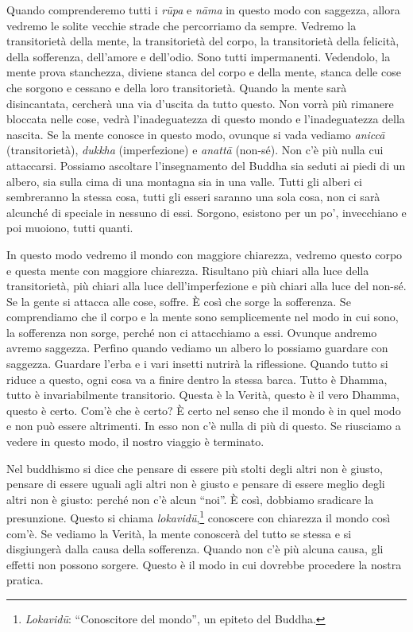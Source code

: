 Quando comprenderemo tutti i \emph{rūpa} e \emph{nāma} in questo modo
con saggezza, allora vedremo le solite vecchie strade che percorriamo da
sempre. Vedremo la transitorietà della mente, la transitorietà del
corpo, la transitorietà della felicità, della sofferenza, dell'amore e
dell'odio. Sono tutti impermanenti. Vedendolo, la mente prova
stanchezza, diviene stanca del corpo e della mente, stanca delle cose
che sorgono e cessano e della loro transitorietà. Quando la mente sarà
disincantata, cercherà una via d'uscita da tutto questo. Non vorrà più
rimanere bloccata nelle cose, vedrà l'inadeguatezza di questo mondo e
l'inadeguatezza della nascita. Se la mente conosce in questo modo,
ovunque si vada vediamo \emph{aniccā} (transitorietà), \emph{dukkha}
(imperfezione) e \emph{anattā} (non-sé). Non c'è più nulla cui
attaccarsi. Possiamo ascoltare l'insegnamento del Buddha sia seduti ai
piedi di un albero, sia sulla cima di una montagna sia in una valle.
Tutti gli alberi ci sembreranno la stessa cosa, tutti gli esseri saranno
una sola cosa, non ci sarà alcunché di speciale in nessuno di essi.
Sorgono, esistono per un po', invecchiano e poi muoiono, tutti quanti.

In questo modo vedremo il mondo con maggiore chiarezza, vedremo questo
corpo e questa mente con maggiore chiarezza. Risultano più chiari alla
luce della transitorietà, più chiari alla luce dell'imperfezione e più
chiari alla luce del non-sé. Se la gente si attacca alle cose, soffre. È
così che sorge la sofferenza. Se comprendiamo che il corpo e la mente
sono semplicemente nel modo in cui sono, la sofferenza non sorge, perché
non ci attacchiamo a essi. Ovunque andremo avremo saggezza. Perfino
quando vediamo un albero lo possiamo guardare con saggezza. Guardare
l'erba e i vari insetti nutrirà la riflessione. Quando tutto si riduce a
questo, ogni cosa va a finire dentro la stessa barca. Tutto è Dhamma,
tutto è invariabilmente transitorio. Questa è la Verità, questo è il
vero Dhamma, questo è certo. Com'è che è certo? È certo nel senso che il
mondo è in quel modo e non può essere altrimenti. In esso non c'è nulla
di più di questo. Se riusciamo a vedere in questo modo, il nostro
viaggio è terminato.

Nel buddhismo si dice che pensare di essere più stolti degli altri non è
giusto, pensare di essere uguali agli altri non è giusto e pensare di
essere meglio degli altri non è giusto: perché non c'è alcun ``noi''. È
così, dobbiamo sradicare la presunzione. Questo si chiama
\emph{lokavidū},\footnote{\emph{Lokavidū}: ``Conoscitore del mondo'', un
  epiteto del Buddha.} conoscere con chiarezza il mondo così com'è. Se
vediamo la Verità, la mente conoscerà del tutto se stessa e si
disgiungerà dalla causa della sofferenza. Quando non c'è più alcuna
causa, gli effetti non possono sorgere. Questo è il modo in cui dovrebbe
procedere la nostra pratica.


